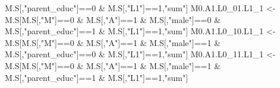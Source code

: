 \documentclass[
]{book}
\newenvironment{Shaded}{\begin{snugshade}}{\end{snugshade}}
\newcommand{\DecValTok}[1]{\textcolor[rgb]{0.00,0.00,0.81}{#1}}
\newcommand{\NormalTok}[1]{#1}
\newcommand{\OtherTok}[1]{\textcolor[rgb]{0.56,0.35,0.01}{#1}}
\newcommand{\SpecialCharTok}[1]{\textcolor[rgb]{0.00,0.00,0.00}{#1}}
\newcommand{\StringTok}[1]{\textcolor[rgb]{0.31,0.60,0.02}{#1}}
\begin{document}
\begin{Shaded}
\begin{Highlighting}[]
\NormalTok{                            M.S[,}\StringTok{"parent\_educ"}\NormalTok{]}\SpecialCharTok{==}\DecValTok{0} \SpecialCharTok{\&}\NormalTok{ M.S[,}\StringTok{"L1"}\NormalTok{]}\SpecialCharTok{==}\DecValTok{1}\NormalTok{,}\StringTok{"sum"}\NormalTok{]}
\NormalTok{  M0.A1.L0\_01.L1\_1 }\OtherTok{\textless{}{-}}\NormalTok{ M.S[M.S[,}\StringTok{"M"}\NormalTok{]}\SpecialCharTok{==}\DecValTok{0} \SpecialCharTok{\&}\NormalTok{ M.S[,}\StringTok{"A"}\NormalTok{]}\SpecialCharTok{==}\DecValTok{1} \SpecialCharTok{\&}\NormalTok{ M.S[,}\StringTok{"male"}\NormalTok{]}\SpecialCharTok{==}\DecValTok{0} \SpecialCharTok{\&} 
\NormalTok{                            M.S[,}\StringTok{"parent\_educ"}\NormalTok{]}\SpecialCharTok{==}\DecValTok{1} \SpecialCharTok{\&}\NormalTok{ M.S[,}\StringTok{"L1"}\NormalTok{]}\SpecialCharTok{==}\DecValTok{1}\NormalTok{,}\StringTok{"sum"}\NormalTok{]}
\NormalTok{  M0.A1.L0\_10.L1\_1 }\OtherTok{\textless{}{-}}\NormalTok{ M.S[M.S[,}\StringTok{"M"}\NormalTok{]}\SpecialCharTok{==}\DecValTok{0} \SpecialCharTok{\&}\NormalTok{ M.S[,}\StringTok{"A"}\NormalTok{]}\SpecialCharTok{==}\DecValTok{1} \SpecialCharTok{\&}\NormalTok{ M.S[,}\StringTok{"male"}\NormalTok{]}\SpecialCharTok{==}\DecValTok{1} \SpecialCharTok{\&} 
\NormalTok{                            M.S[,}\StringTok{"parent\_educ"}\NormalTok{]}\SpecialCharTok{==}\DecValTok{0} \SpecialCharTok{\&}\NormalTok{ M.S[,}\StringTok{"L1"}\NormalTok{]}\SpecialCharTok{==}\DecValTok{1}\NormalTok{,}\StringTok{"sum"}\NormalTok{]}
\NormalTok{  M0.A1.L0\_11.L1\_1 }\OtherTok{\textless{}{-}}\NormalTok{ M.S[M.S[,}\StringTok{"M"}\NormalTok{]}\SpecialCharTok{==}\DecValTok{0} \SpecialCharTok{\&}\NormalTok{ M.S[,}\StringTok{"A"}\NormalTok{]}\SpecialCharTok{==}\DecValTok{1} \SpecialCharTok{\&}\NormalTok{ M.S[,}\StringTok{"male"}\NormalTok{]}\SpecialCharTok{==}\DecValTok{1} \SpecialCharTok{\&} 
\NormalTok{                            M.S[,}\StringTok{"parent\_educ"}\NormalTok{]}\SpecialCharTok{==}\DecValTok{1} \SpecialCharTok{\&}\NormalTok{ M.S[,}\StringTok{"L1"}\NormalTok{]}\SpecialCharTok{==}\DecValTok{1}\NormalTok{,}\StringTok{"sum"}\NormalTok{]}
  

\end{Highlighting}
\end{Shaded}
\end{document}
